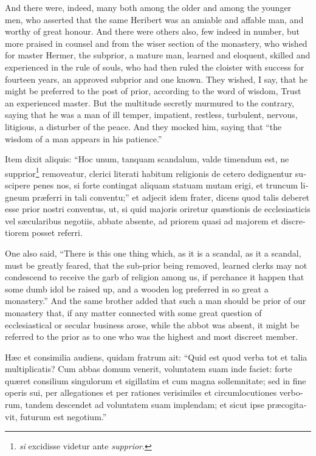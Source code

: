 \documentclass{book}
\begin{document}
\begin{paracol}{2}
\switchcolumn

And there were, indeed, many both among the older and among the younger men, who asserted that the same Heribert was an amiable and affable man, and worthy of great honour. And there were others also, few indeed in number, but more praised in counsel and from the wiser section of the monastery, who wished for master Hermer, the subprior, a mature man, learned and eloquent, skilled and experienced in the rule of souls, who had then ruled the cloister with success for fourteen years, an approved subprior and one known. They wished, I say, that he might be preferred to the post of prior, according to the word of wisdom, Trust an experienced master. But the multitude secretly murmured to the contrary, saying that he was a man of ill temper, impatient, restless, turbulent, nervous, litigious, a disturber of the peace. And they mocked him, saying that ``the wisdom of a man appears in his patience.''

\switchcolumn*

\begin{otherlanguage}{latin}
Item dixit aliquis: ``Hoc unum, tanquam scandalum, valde timendum est, ne supprior\footnote[\ddag]{\emph{si} excidisse videtur ante \emph{supprior}.} removeatur, clerici literati habitum religionis de cetero dedignentur suscipere penes nos, si forte contingat aliquam statuam mutam erigi, et truncum ligneum pr\ae{}ferri in tali conventu;'' et adjecit idem frater, dicens quod talis deberet esse prior nostri conventus, ut, si quid majoris oriretur qu\ae{}stionis de ecclesiasticis vel s\ae{}cularibus negotiis, abbate absente, ad priorem quasi ad majorem et discretiorem posset referri. 
\end{otherlanguage}

\switchcolumn

One also said, ``There is this one thing which, as it is a scandal, as it a scandal, must be greatly feared, that the sub-prior being removed, learned clerks may not condescend to receive the garb of religion among us, if perchance it happen that some dumb idol be raised up, and a wooden log preferred in so great a monastery.'' And the same brother added that such a man should be prior of our monastery that, if any matter connected with some great question of ecclesiastical or secular business arose, while the abbot was absent, it might be referred to the prior as to one who was the highest and most discreet member.

\switchcolumn*

\begin{otherlanguage}{latin}
H\ae{}c et consimilia audiens, quidam fratrum ait: ``Quid est quod verba tot et talia multiplicatis? Cum abbas domum venerit, voluntatem suam inde faciet: forte qu\ae{}ret consilium singulorum et sigillatim et cum magna sollemnitate; sed in fine operis sui, per allegationes et per rationes verisimiles et circumlocutiones verborum, tandem descendet ad voluntatem suam implendam; et sicut ipse pr\ae{}cogitavit, futurum est negotium.''
\end{otherlanguage}


\end{paracol}
\end{document}

